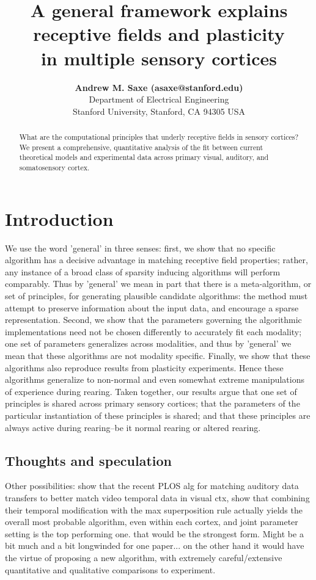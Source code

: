 \documentclass[10pt,letterpaper]{article}
\title{A general framework explains receptive fields and plasticity \\ in multiple sensory cortices}
\author{{\large \bf Andrew M. Saxe (asaxe@stanford.edu)} \\
  Department of Electrical Engineering \\
Stanford University, Stanford, CA 94305 USA}
\begin{document}
\maketitle

\begin{abstract}
What are the computational principles that underly receptive fields in sensory cortices? We present a comprehensive, quantitative analysis of the fit between current theoretical models and experimental data across primary visual, auditory, and somatosensory cortex. 
\end{abstract}

\section{Introduction}
We use the word 'general' in three senses: first, we show that no specific algorithm has a decisive advantage in matching receptive field properties; rather, any instance of a broad class of sparsity inducing algorithms will perform comparably. Thus by 'general' we mean in part that there is a meta-algorithm, or set of principles, for generating plausible candidate algorithms: the method must attempt to preserve information about the input data, and encourage a sparse representation. Second, we show that the parameters governing the algorithmic implementations need not be chosen differently to accurately fit each modality; one set of parameters generalizes across modalities, and thus by 'general' we mean that these algorithms are not modality specific. Finally, we show that these algorithms also reproduce results from plasticity experiments. Hence these algorithms generalize to non-normal and even somewhat extreme manipulations of experience during rearing. Taken together, our results argue that one set of principles is shared across primary sensory cortices;  that the parameters of the particular instantiation of these principles is shared; and that these principles are always active during rearing--be it normal rearing or altered rearing.

\subsection{Thoughts and speculation}
Other possibilities: show that the recent PLOS alg for matching auditory data transfers to better match video temporal data in visual ctx, show that combining their temporal modification with the max superposition rule actually yields the overall most probable algorithm, even within each cortex, and joint parameter setting is the top performing one. that would be the strongest form. Might be a bit much and a bit longwinded for one paper... on the other hand it would have the virtue of proposing a new algorithm, with extremely careful/extensive quantitative and qualitative comparisons to experiment.
\end{document}
